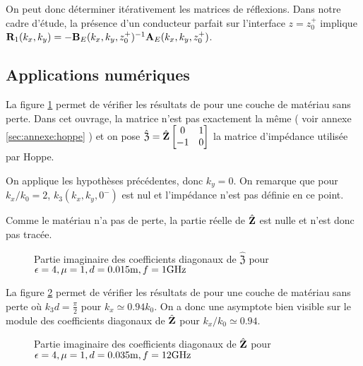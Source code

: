     On peut donc déterminer itérativement les matrices de réflexions. Dans notre cadre d'étude, la présence d'un conducteur parfait sur l'interface \(z=z_0^+\) implique \(\mathbf{R}_{1}(k_x,k_y) = -\mathbf{B}_E(k_x,k_y,z_0^+)^{-1}\mathbf{A}_E(k_x,k_y,z_0^+)\).

\subsection{Applications numériques}

  La figure \ref{fig:imp_fourier:plan:hoppe} permet de vérifier les résultats de \cite[p.~33]{hoppe_impedance_1995} pour une couche de matériau sans perte. Dans cet ouvrage, la matrice n’est pas exactement la même ( voir annexe \ref{sec:annexe:hoppe} ) et on pose \(\hat{\mathfrak{Z}} = \hat{\mathbf{Z}}\begin{bmatrix}0&1\\-1&0\end{bmatrix}\) la matrice d'impédance utilisée par Hoppe.

  On applique les hypothèses précédentes, donc \(k_y=0\). On remarque que pour \(k_x\slash k_0=2\), \(k_3(k_x,k_y,0^-)\) est nul et l'impédance n'est pas définie en ce point. 

  Comme le matériau n'a pas de perte, la partie réelle de \(\hat{\mathfrak{\mathbf{Z}}}\) est nulle et n'est donc pas tracée.
  \begin{figure}[!hbt]
      \centering
      
      \caption[Reproduction résultat Hoppe & Rahmat-Samii p.~33]{Partie imaginaire des coefficients diagonaux de \(\hat{\mathfrak Z}\) pour \(\epsilon = 4, \mu = 1, d=0.015\text{m}, f=1\text{GHz}\)}
      \label{fig:imp_fourier:plan:hoppe}
  \end{figure}

  La figure \ref{fig:imp_fourier:plan:soudais} permet de vérifier les résultats de \cite{soudais_3d_2017} pour une couche de matériau sans perte où \(k_3d = \frac{\pi}{2}\) pour \(k_x \simeq 0.94 k_0\). On a donc une asymptote bien visible sur le module des coefficients diagonaux de \(\hat{\mathbf{Z}}\) pour \(k_x\slash k_0 \simeq 0.94\).
  \begin{figure}[!hbt]
      \centering
      
      \caption[Reproduction résultat P. Soudais p.~11]{Partie imaginaire des coefficients diagonaux de \(\hat{\mathbf{Z}}\) pour \(\epsilon = 4, \mu = 1, d=0.035\text{m}, f=12\text{GHz}\)}
      \label{fig:imp_fourier:plan:soudais}
  \end{figure}



\FloatBarrier
